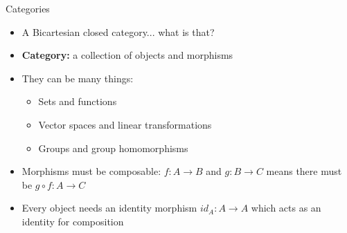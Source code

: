 \documentclass{beamer}
\begin{document}
\begin{frame}{Categories}
    \begin{itemize}
        \item A Bicartesian closed category... what is that?
        \item \textbf{Category:} a collection of objects and morphisms
        \item They can be many things:
        \begin{itemize}
            \item Sets and functions
            \item Vector spaces and linear transformations
            \item Groups and group homomorphisms
        \end{itemize}
        \item Morphisms must be composable: $f: A \to B$ and $g: B \to C$ means there must be $g \circ f: A \to C$
        \item Every object needs an identity morphism $id_A: A \to A$ which acts as an identity for composition
    \end{itemize}
\end{frame}
\end{document}
